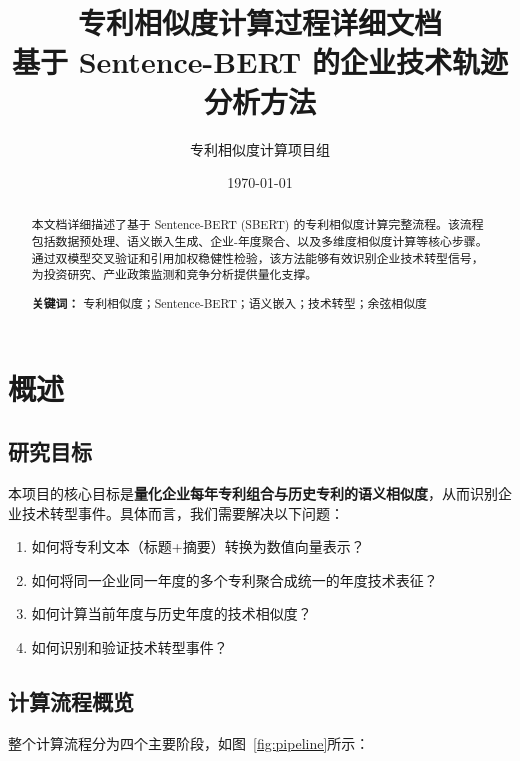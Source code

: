 \documentclass[12pt,a4paper]{article}
\title{\textbf{专利相似度计算过程详细文档}\\[0.3cm]
\large 基于 Sentence-BERT 的企业技术轨迹分析方法}
\author{专利相似度计算项目组}
\date{\today}
\theoremstyle{definition}
\begin{document}
\maketitle
\thispagestyle{empty}

\begin{abstract}
本文档详细描述了基于 Sentence-BERT (SBERT) 的专利相似度计算完整流程。该流程包括数据预处理、语义嵌入生成、企业-年度聚合、以及多维度相似度计算等核心步骤。通过双模型交叉验证和引用加权稳健性检验，该方法能够有效识别企业技术转型信号，为投资研究、产业政策监测和竞争分析提供量化支撑。

\textbf{关键词：} 专利相似度；Sentence-BERT；语义嵌入；技术转型；余弦相似度
\end{abstract}

\tableofcontents
\newpage

\section{概述}

\subsection{研究目标}

本项目的核心目标是\textbf{量化企业每年专利组合与历史专利的语义相似度}，从而识别企业技术转型事件。具体而言，我们需要解决以下问题：

\begin{enumerate}
    \item 如何将专利文本（标题+摘要）转换为数值向量表示？
    \item 如何将同一企业同一年度的多个专利聚合成统一的年度技术表征？
    \item 如何计算当前年度与历史年度的技术相似度？
    \item 如何识别和验证技术转型事件？
\end{enumerate}

\subsection{计算流程概览}

整个计算流程分为四个主要阶段，如图~\ref{fig:pipeline}所示：
\end{document}
